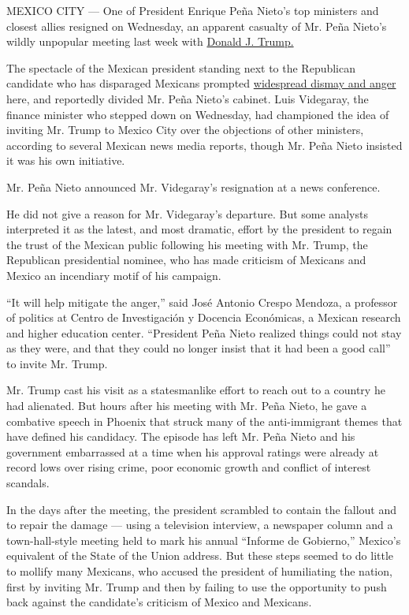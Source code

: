 MEXICO CITY --- One of President Enrique Peña Nieto's top ministers and
closest allies resigned on Wednesday, an apparent casualty of Mr. Peña
Nieto's wildly unpopular meeting last week with
\href{http://www.nytimes.com/topic/person/donald-trump}{Donald J.
Trump.}

The spectacle of the Mexican president standing next to the Republican
candidate who has disparaged Mexicans prompted
\href{http://www.nytimes.com/2016/09/01/world/americas/trump-mexico-pena-nieto-reaction.html}{widespread
dismay and anger} here, and reportedly divided Mr. Peña Nieto's cabinet.
Luis Videgaray, the finance minister who stepped down on Wednesday, had
championed the idea of inviting Mr. Trump to Mexico City over the
objections of other ministers, according to several Mexican news media
reports, though Mr. Peña Nieto insisted it was his own initiative.

Mr. Peña Nieto announced Mr. Videgaray's resignation at a news
conference.

He did not give a reason for Mr. Videgaray's departure. But some
analysts interpreted it as the latest, and most dramatic, effort by the
president to regain the trust of the Mexican public following his
meeting with Mr. Trump, the Republican presidential nominee, who has
made criticism of Mexicans and Mexico an incendiary motif of his
campaign.

``It will help mitigate the anger,'' said José Antonio Crespo Mendoza, a
professor of politics at Centro de Investigación y Docencia Económicas,
a Mexican research and higher education center. ``President Peña Nieto
realized things could not stay as they were, and that they could no
longer insist that it had been a good call'' to invite Mr. Trump.

Mr. Trump cast his visit as a statesmanlike effort to reach out to a
country he had alienated. But hours after his meeting with Mr. Peña
Nieto, he gave a combative speech in Phoenix that struck many of the
anti-immigrant themes that have defined his candidacy. The episode has
left Mr. Peña Nieto and his government embarrassed at a time when his
approval ratings were already at record lows over rising crime, poor
economic growth and conflict of interest scandals.

In the days after the meeting, the president scrambled to contain the
fallout and to repair the damage --- using a television interview, a
newspaper column and a town-hall-style meeting held to mark his annual
``Informe de Gobierno,'' Mexico's equivalent of the State of the Union
address. But these steps seemed to do little to mollify many Mexicans,
who accused the president of humiliating the nation, first by inviting
Mr. Trump and then by failing to use the opportunity to push back
against the candidate's criticism of Mexico and Mexicans.

